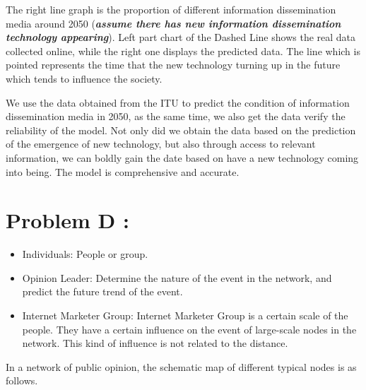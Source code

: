 \documentclass[a4paper,11pt]{article}
\begin{document}
\par The right line graph is the proportion of different information dissemination media around 2050 (\textbf{\emph{assume there has new information dissemination technology appearing}}). Left part chart of the Dashed Line shows the real data collected online, while the right one displays the predicted data. The line which is pointed represents the time that the new technology turning up in the future which tends to influence the society.

\par We use the data obtained from the ITU to predict the condition of information dissemination media in 2050, as the same time, we also get the data verify the reliability of the model. Not only did we obtain the data based on the prediction of the emergence of new technology, but also through access to relevant information, we can boldly gain the date based on have a new technology coming into being. The model is comprehensive and accurate.









\section{Problem D : }
\par  



\begin{itemize}
\item Individuals: People or group.
\item Opinion Leader: Determine the nature of the event in the network, and predict the future trend of the event.
\item Internet Marketer Group: Internet Marketer Group is a certain scale of the people. They have a certain influence on the event of large-scale nodes in the network. This kind of influence is not related to the distance.
\end{itemize}



\par In a network of public opinion, the schematic map of different typical nodes is as follows.
\end{document}
